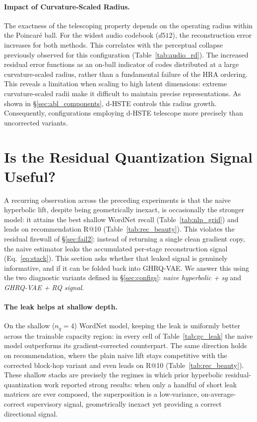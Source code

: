 \documentclass[12pt]{report}
\begin{document}
\paragraph{Impact of Curvature-Scaled Radius.}
The exactness of the telescoping property depends on the operating radius within the Poincar\'e ball. For the widest audio codebook ($d512$), the reconstruction error increases for both methods. This correlates with the perceptual collapse previously observed for this configuration (Table~\ref{tab:audio_rd}). The increased residual error functions as an on-ball indicator of codes distributed at a large curvature-scaled radius, rather than a fundamental failure of the HRA ordering. This reveals a limitation when scaling to high latent dimensions: extreme curvature-scaled radii make it difficult to maintain precise representations. As shown in \S\ref{sec:abl_components}, d-HSTE controls this radius growth. Consequently, configurations employing d-HSTE telescope more precisely than uncorrected variants.

\section{Is the Residual Quantization Signal Useful?}
\label{sec:rq_signal}

A recurring observation across the preceding experiments is that the naive hyperbolic lift, despite being geometrically inexact, is occasionally the stronger model: it attains the best shallow WordNet recall (Table~\ref{tab:nlp_grid}) and leads on recommendation R@10 (Table~\ref{tab:rec_beauty}). This violates the residual firewall of \S\ref{sec:fail2}: instead of returning a single clean gradient copy, the naive estimator leaks the accumulated per-stage reconstruction signal (Eq.~\ref{eq:stack}). This section asks whether that leaked signal is genuinely informative, and if it can be folded back into GHRQ-VAE. We answer this using the two diagnostic variants defined in \S\ref{sec:configs}: \emph{naive hyperbolic + sg} and \emph{GHRQ-VAE + RQ signal}.

\paragraph{The leak helps at shallow depth.}
On the shallow ($n_q=4$) WordNet model, keeping the leak is uniformly better across the trainable capacity region: in every cell of Table~\ref{tab:gc_leak} the naive model outperforms its gradient-corrected counterpart. The same direction holds on recommendation, where the plain naive lift stays competitive with the corrected block-hop variant and even leads on R@10 (Table~\ref{tab:rec_beauty}). These shallow stacks are precisely the regimes in which prior hyperbolic residual-quantization work reported strong results: when only a handful of short leak matrices are ever composed, the superposition is a low-variance, on-average-correct supervisory signal, geometrically inexact yet providing a correct directional signal.
\end{document}

